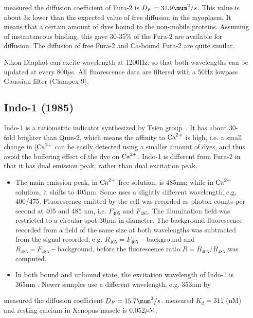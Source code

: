 \citep{blatter1990} measured the diffusion coefficient of Fura-2 is $D_F =
31.9\mum^2/s$.
This value is about 3x lower than the expected value of free diffusion in the
myoplasm. It means that a certain amount of dyes bound to the non-mobile
proteins. Assuming of instantaneous binding, this gave 30-35\% of the Fura-2 are
available for diffusion.
The diffusion of free Fura-2 and Ca-bound Fura-2 are quite similar.


\begin{framed}
  Nikon Diaphot can excite wavelength at 1200Hz, so that both
  wavelengths can be updated at every 800$\mu$s. All fluorescence data
  are filtered with a 50Hz lowpass Gaussian filter (Clampex 9).
\end{framed}






\subsection{Indo-1 (1985)}
\label{sec:indo-1}

Indo-1 is a ratiometric indicator synthesized by Tsien
group~\citep{grynkiewicz1985}.
It has about 30-fold brighter than Quin-2, which means the affinity to ${\text{Ca}^{2+}}$ is
high, i.e. a small change in $[{\text{Ca}^{2+}}$ can be easily detected using a smaller
amount of dyes, and thus avoid the buffering effect of the dye on ${\text{Ca}^{2+}}$.
Indo-1 is different from Fura-2 in that it has dual emission peak, rather than
dual excitation peak. 

\begin{itemize}
\item The main emission peak, in ${\text{Ca}^{2+}}$-free solution, is 485nm; while
  in ${\text{Ca}^{2+}}$ solution, it shifts to 405nm. Some uses a slightly different
  wavelength, e.g. 400/475. Fluorescence emitted by the cell was recorded as
  photon counts per second at 405 and 485 nm, i.e. $F_{405}$ and $F_{485}$. The
  illumination field was restricted to a circular spot 30$\mu$m in diameter. The
  background fluorescence recorded from a field of the same size at both
  wavelengths was subtracted from the signal recorded, e.g.
  $R_{405}=F_{405}-\text{background}$ and $R_{485}=F_{485}-\text{background}$,
  before the fluorescence ratio $R=R_{405}/R_{485}$ was computed.

\item In both bound and unbound state, the excitation wavelength of
  Indo-1 is 365nm \citep{grynkiewicz1985}. Newer samples use a different
  wavelength, e.g. 353nm by \citep{}
\end{itemize}
\citep{blatter1990} measured the diffusion coefficient $D_F = 15.7\mum^2/s$.
\citep{westerblad1996} measured $K_d = 311$ (nM) and resting calcium in Xenopus
muscle is 0.052${\mu\text{M}}$. 

